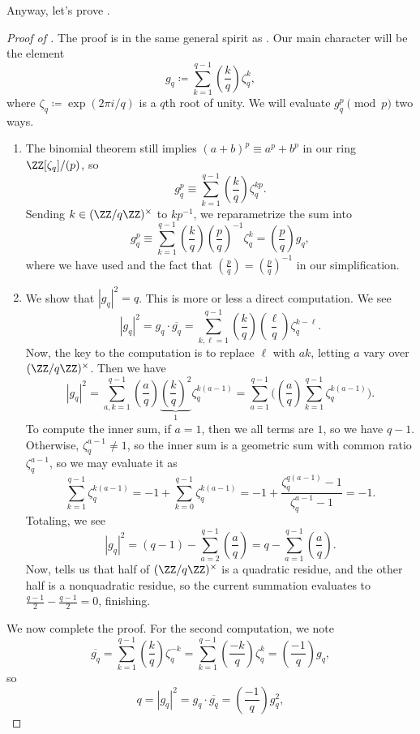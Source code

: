 \documentclass[../notes.tex]{subfiles}
\begin{document}
Anyway, let's prove .
\begin{proof}[Proof of ]
	The proof is in the same general spirit as . Our main character will be the element
	\[g_q\coloneqq\sum_{k=1}^{q-1}\left(\frac kq\right)\zeta_q^k,\]
	where $\zeta_q\coloneqq\exp(2\pi i/q)$ is a $q$th root of unity. We will evaluate $g_q^p\pmod p$ two ways.
	\begin{enumerate}
		\item The binomial theorem still implies $(a+b)^p\equiv a^p+b^p$ in our ring $\ZZ[\zeta_q]/(p)$, so
		\[g_q^p\equiv\sum_{k=1}^{q-1}\left(\frac kq\right)\zeta_q^{kp}.\]
		Sending $k\in(\ZZ/q\ZZ)^\times$ to $kp^{-1}$, we reparametrize the sum into
		\[g_q^p\equiv\sum_{k=1}^{q-1}\left(\frac kq\right)\left(\frac pq\right)^{-1}\zeta_q^k=\left(\frac pq\right)g_q,\]
		where we have used  and the fact that $\left(\frac pq\right)=\left(\frac pq\right)^{-1}$ in our simplification.
		\item We show that $\left|g_q\right|^2=q$. This is more or less a direct computation. We see
		\[\left|g_q\right|^2 = g_q\cdot\overline{g_q} = \sum_{k,\ell=1}^{q-1}\left(\frac kq\right)\left(\frac\ell q\right)\zeta_q^{k-\ell}.\]
		Now, the key to the computation is to replace $\ell$ with $ak$, letting $a$ vary over $(\ZZ/q\ZZ)^\times$. Then we have
		\[\left|g_q\right|^2=\sum_{a,k=1}^{q-1}\left(\frac aq\right)\underbrace{\left(\frac kq\right)^2}_1\zeta_q^{k(a-1)}=\sum_{a=1}^{q-1}\Bigg(\left(\frac aq\right)\sum_{k=1}^{q-1}\zeta_q^{k(a-1)}\Bigg).\]
		To compute the inner sum, if $a=1$, then we all terms are $1$, so we have $q-1$. Otherwise, $\zeta_q^{a-1}\ne1$, so the inner sum is a geometric sum with common ratio $\zeta_q^{a-1}$, so we may evaluate it as
		\[\sum_{k=1}^{q-1}\zeta_q^{k(a-1)}=-1+\sum_{k=0}^{q-1}\zeta_q^{k(a-1)}=-1+\frac{\zeta_q^{q(a-1)}-1}{\zeta_q^{a-1}-1}=-1.\]
		Totaling, we see
		\[\left|g_q\right|^2=(q-1)-\sum_{a=2}^{q-1}\left(\frac aq\right)=q-\sum_{a=1}^{q-1}\left(\frac aq\right).\]
		Now,  tells us that half of $(\ZZ/q\ZZ)^\times$ is a quadratic residue, and the other half is a nonquadratic residue, so the current summation evaluates to $\frac{q-1}2-\frac{q-1}2=0$, finishing.
	\end{enumerate}
	We now complete the proof. For the second computation, we note
	\[\overline{g_q}=\sum_{k=1}^{q-1}\left(\frac kq\right)\zeta_q^{-k}=\sum_{k=1}^{q-1}\left(\frac{-k}q\right)\zeta_q^{k}=\left(\frac{-1}q\right)g_q,\]
	so
	\[q=\left|g_q\right|^2=g_q\cdot\overline{g_q}=\left(\frac{-1}q\right)g_q^2,\]

\end{proof}
\end{document}
